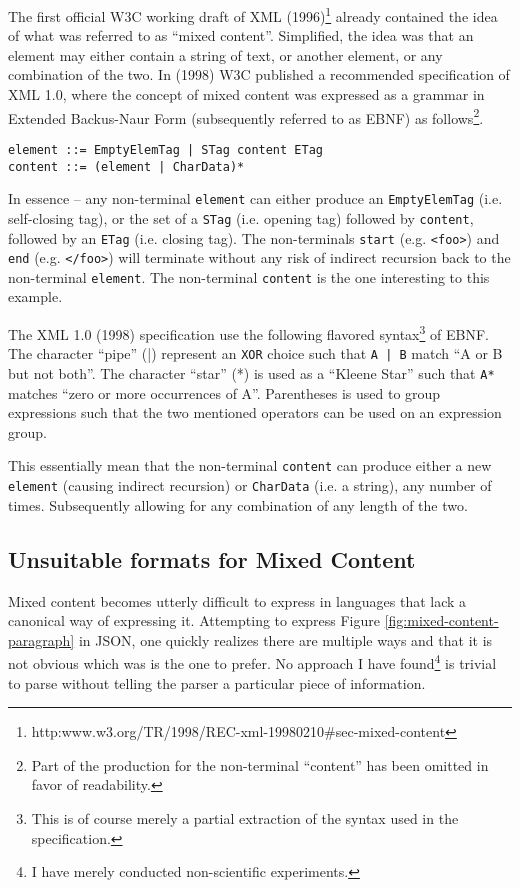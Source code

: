 \documentclass{scrreprt}
\begin{document}

The first official W3C working draft of XML (1996)\footnote{http:\/\/www.w3.org/TR/1998/REC-xml-19980210\#sec-mixed-content} already contained the idea of what was referred to as ``mixed content''. Simplified, the idea was that an element may either contain a string of text, or another element, or any combination of the two. In (1998) W3C published a recommended specification of XML 1.0, where the concept of mixed content was expressed as a grammar in Extended Backus-Naur Form (subsequently referred to as EBNF) as follows\footnote{Part of the production for the non-terminal ``content'' has been omitted in favor of readability.}.

\begin{lstlisting}
element ::= EmptyElemTag | STag content ETag 
content ::= (element | CharData)*
\end{lstlisting}

In essence -- any non-terminal \texttt{element} can either produce an \texttt{EmptyElemTag} (i.e. self-closing tag), or the set of a \texttt{STag} (i.e. opening tag) followed by \texttt{content}, followed by an \texttt{ETag} (i.e. closing tag). The non-terminals \texttt{start} (e.g. \texttt{<foo>}) and \texttt{end} (e.g. \texttt{</foo>}) will terminate without any risk of indirect recursion back to the non-terminal \texttt{element}. The non-terminal \texttt{content} is the one interesting to this example.

The XML 1.0 (1998) specification use the following flavored syntax\footnote{This is of course merely a partial extraction of the syntax used in the specification.} of EBNF. The character ``pipe'' (|) represent an \texttt{XOR} choice such that \texttt{A | B} match ``A or B but not both''. The character ``star'' (*) is used as a ``Kleene Star'' such that \texttt{A*} matches ``zero or more occurrences of A''. Parentheses is used to group expressions such that the two mentioned operators can be used on an expression group.

This essentially mean that the non-terminal \texttt{content} can produce either a new \texttt{element} (causing indirect recursion) or \texttt{CharData} (i.e. a string), any number of times. Subsequently allowing for any combination of any length of the two.



\subsection{Unsuitable formats for Mixed Content}
Mixed content becomes utterly difficult to express in languages that lack a canonical way of expressing it. Attempting to express Figure \ref{fig:mixed-content-paragraph} in JSON, one quickly realizes there are multiple ways and that it is not obvious which was is the one to prefer. No approach I have found\footnote{I have merely conducted non-scientific experiments.} is trivial to parse without telling the parser a particular piece of information.
\end{document}
